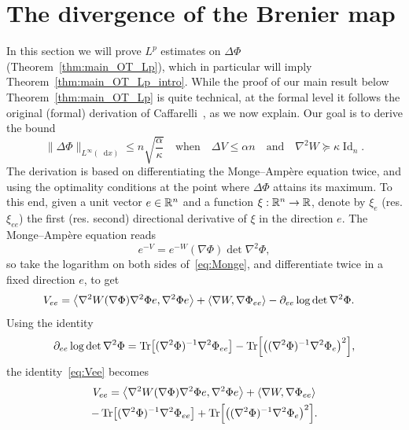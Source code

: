 \documentclass[AHL,Unicode,longabstracts]{cedram}
\newcommand{\R}{\mathbb R}
\DeclareMathOperator{\Id}{Id}
\DeclareMathOperator{\Tr}{Tr}
\newcommand{\V}{V}
\newcommand{\W}{W}
\newcommand{\dd}{n}
\newcommand{\lsh}{\alpha}
\newcommand{\lc}{\kappa}
\newcommand*\diff{\mathop{}\!\mathrm{d}}
\newcommand{\OT}{\Phi}
\renewcommand*{\to}{\mathchoice{\longrightarrow}{\rightarrow}{\rightarrow}{\rightarrow}}
\let\originalleft\left
\let\originalright\right
\renewcommand{\left}{\mathopen{}\mathclose\bgroup\originalleft}
\renewcommand{\right}{\aftergroup\egroup\originalright}
\let\oldin\in
\renewcommand{\in}{\mathchoice{\oldin}{\oldin}{\,\oldin\,}{\,\oldin\,}}
\begin{document}
\section{The divergence of the Brenier map}\label{sec:divergence_OT}
In this section we will prove $L^p$ estimates on $\Delta\OT$ (Theorem~\ref{thm:main_OT_Lp}), which in particular will imply Theorem~\ref{thm:main_OT_Lp_intro}. While the proof of our main result below Theorem~\ref{thm:main_OT_Lp} is quite technical, at the formal level it follows the original (formal) derivation of Caffarelli~\cite{MR1800860}, as we now explain. Our goal is to derive the bound
\begin{equation}\label{eq:infty_bound_main_sec}
\|\Delta\OT\|_{L^{\infty}(\diff x)}\le \dd\sqrt{ \frac{\lsh}{\lc}} \quad \text{when}\quad \Delta \V\le \lsh\dd\quad\text{and}\quad \nabla^2\W\succeq \lc \Id_{\dd}.
\end{equation}
The derivation is based on differentiating the Monge--Ampère equation twice, and using the optimality conditions at the point where $\Delta\OT$ attains its maximum. To this end, given a unit vector $e\in \R^{\dd}$ and a function $\xi:\R^{\dd}\to \R$, denote by $\xi_e$ (res. $\xi_{ee}$) the first (res. second) directional derivative of $\xi$ in the direction $e$. The Monge--Ampère equation reads
\begin{equation}\label{eq:Monge}
e^{-\V}=e^{-\W}(\nabla \OT)\det\nabla^2\OT,
\end{equation}
so take the logarithm on both sides of~\eqref{eq:Monge}, and differentiate twice in a fixed direction $e$, to get
\begin{align}\label{eq:Vee}
\V_{ee}&=\left\langle \nabla^2\W(\nabla\OT)\nabla^2\OT e,\nabla^2\OT e\right\rangle+\langle \nabla\W,\nabla\OT_{ee}\rangle-\partial_{ee}\log\det \nabla^2\OT.
\end{align}
Using the identity
\begin{equation}\label{eq:Jacobi_ee}
\partial_{ee}\log\det \nabla^2\OT=\Tr\left[(\nabla^2\OT)^{-1}\nabla^2\OT_{ee}\right]-\Tr\left[\left((\nabla^2\OT)^{-1}\nabla^2\OT_e\right)^2\right],
\end{equation}
the identity~\eqref{eq:Vee} becomes
\begin{multline}\label{eq:Vee+}
\V_{ee}=\left\langle \nabla^2\W(\nabla\OT)\nabla^2\OT e,\nabla^2\OT e\right\rangle+\langle \nabla\W,\nabla\OT_{ee}\rangle\\
-\Tr\left[(\nabla^2\OT)^{-1}\nabla^2\OT_{ee}\right]+\Tr\left[\left((\nabla^2\OT)^{-1}\nabla^2\OT_e\right)^2\right].
\end{multline}
\end{document}
